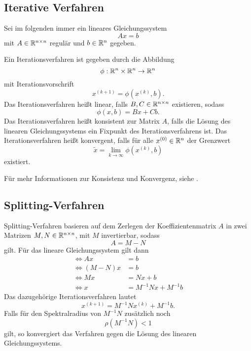 \documentclass{scrartcl}
\begin{document}
\subsection{Iterative Verfahren}
Sei im folgenden immer ein lineares Gleichungssystem
\[Ax=b\]
mit \(A \in \mathbb{R}^{n \times n}\) regulär und \(b \in \mathbb{R}^n\) gegeben.
\begin{definition}\cite[p.~69-70]{Iterative}
    Ein Iterationsverfahren ist gegeben durch die Abbildung
    \[\phi:\mathbb{R}^n \times \mathbb{R}^n \rightarrow \mathbb{R}^n\]
    mit Iterationsvorschrift
    \[x^{(k+1)}=\phi(x^{(k)},b).\]
    Das Iterationsverfahren heißt linear, falls \(B,C \in \mathbb{R}^{n \times n}\)
    existieren, sodass
    \[\phi(x,b)=Bx+Cb.\]
    Das Iterationsverfahren heißt konsistent zur Matrix \(A\), falls die Lösung des linearen Gleichungssystems ein Fixpunkt des Iterationsverfahrens ist.
    Das Iterationsverfahren heißt konvergent, falls für alle \(x^{(0)} \in \mathbb{R}^n\) der Grenzwert
    \[\tilde{x} = \lim_{k \to \infty} \phi(x^{(k)},b)\] existiert.
\end{definition}
Für mehr Informationen zur Konsistenz und Konvergenz, siehe \cite[p.~71-72]{Iterative}.



\subsection{Splitting-Verfahren}
Splitting-Verfahren basieren auf dem Zerlegen der Koeffizientenmatrix \(A\) in
zwei Matrizen \(M, N \in \mathbb{R}^{n \times n}\), mit \(M\) invertierbar, sodass
\[A = M-N\]
gilt. Für das lineare Gleichungssystem gilt dann
\begin{align*}
    \iff Ax     & = b                  \\
    \iff (M-N)x & = b                  \\
    \iff Mx     & = Nx + b             \\
    \iff x      & = M^{-1}Nx + M^{-1}b
\end{align*}
Das dazugehörige Iterationsverfahren lautet\cite[p.~165]{SOR}
\[x^{(k+1)}= M^{-1}Nx^{(k)} + M^{-1}b.\]
Falls für den Spektralradius von \(M^{-1}N\) zusätzlich noch
\[\rho(M^{-1}N)<1\]
gilt, so konvergiert das Verfahren gegen die Lösung des linearen Gleichungssystems\cite[p.~73-74]{Iterative}.
\end{document}
